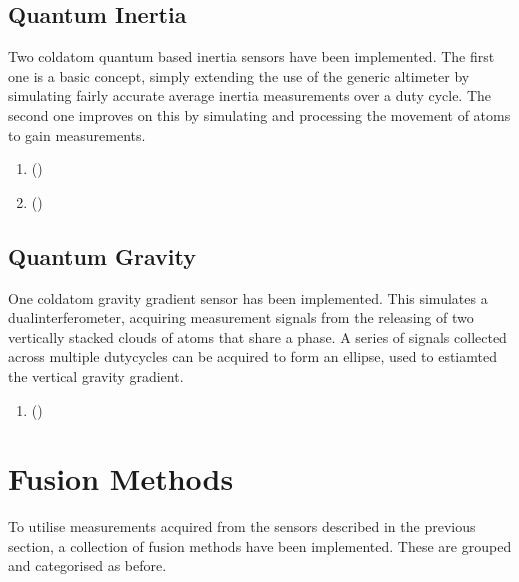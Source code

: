 \documentclass[letterpaper,10pt,english]{sphinxmanual}
\begin{document}
\subsection{Quantum Inertia}
\label{\detokenize{usage/measurement:quantum-inertia}}
\sphinxAtStartPar
Two cold\sphinxhyphen{}atom quantum based inertia sensors have been implemented. The first one is a basic concept, simply extending
the use of the generic altimeter by simulating fairly accurate average inertia measurements over a duty cycle. The
second one improves on this by simulating and processing the movement of atoms to gain measurements.
\begin{enumerate}
%
\item {} 
\sphinxAtStartPar
{\hyperref[\detokenize{modules/quantum/base:base-py}]{}} ()

\item {} 
\sphinxAtStartPar
{\hyperref[\detokenize{modules/quantum/realistic:realistic-py}]{}} ()

\end{enumerate}


\subsection{Quantum Gravity}
\label{\detokenize{usage/measurement:quantum-gravity}}
\sphinxAtStartPar
One cold\sphinxhyphen{}atom gravity gradient sensor has been implemented. This simulates a dual\sphinxhyphen{}interferometer, acquiring
measurement signals from the releasing of two vertically stacked clouds of atoms that share a phase. A series of
signals collected across multiple duty\sphinxhyphen{}cycles can be acquired to form an ellipse, used to estiamted the
vertical gravity gradient.
\begin{enumerate}
%
\item {} 
\sphinxAtStartPar
{\hyperref[\detokenize{modules/quantum/base:base-py}]{}} ()

\end{enumerate}

\sphinxstepscope


\section{Fusion Methods}
\label{\detokenize{usage/fusion:fusion-methods}}\label{\detokenize{usage/fusion::doc}}
\sphinxAtStartPar
To utilise measurements acquired from the sensors described in the previous section, a collection of fusion methods
have been implemented. These are grouped and categorised as before.
\end{document}
